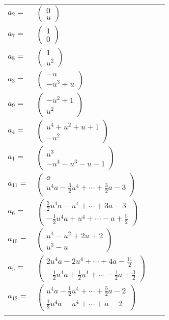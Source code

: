 \documentclass[1p]{elsarticle_modified}
\theoremstyle{definition}
\begin{document}
\begin{tabular}{m{7pt} m{180pt} m{7pt} m{180pt} }
\flushright $a_{2}=$&$\begin{pmatrix}0\\u\end{pmatrix}$ \\
\flushright $a_{7}=$&$\begin{pmatrix}1\\0\end{pmatrix}$ \\
\flushright $a_{8}=$&$\begin{pmatrix}1\\u^2\end{pmatrix}$ \\
\flushright $a_{3}=$&$\begin{pmatrix}- u\\- u^3+u\end{pmatrix}$ \\
\flushright $a_{9}=$&$\begin{pmatrix}- u^2+1\\u^2\end{pmatrix}$ \\
\flushright $a_{4}=$&$\begin{pmatrix}u^4+u^2+u+1\\- u^2\end{pmatrix}$ \\
\flushright $a_{1}=$&$\begin{pmatrix}u^3\\- u^4- u^3- u-1\end{pmatrix}$ \\
\flushright $a_{11}=$&$\begin{pmatrix}a\\u^4 a-\frac{3}{2} u^4+\cdots+\frac{3}{2} a-3\end{pmatrix}$ \\
\flushright $a_{6}=$&$\begin{pmatrix}\frac{3}{2} u^4 a- u^4+\cdots+3 a-3\\-\frac{1}{2} u^4 a+u^4+\cdots- a+\frac{5}{2}\end{pmatrix}$ \\
\flushright $a_{10}=$&$\begin{pmatrix}u^4- u^2+2 u+2\\u^3- u\end{pmatrix}$ \\
\flushright $a_{5}=$&$\begin{pmatrix}2 u^4 a-2 u^4+\cdots+4 a-\frac{11}{2}\\-\frac{1}{2} u^4 a+\frac{1}{2} u^4+\cdots-\frac{1}{2} a+\frac{3}{2}\end{pmatrix}$ \\
\flushright $a_{12}=$&$\begin{pmatrix}u^4 a-\frac{1}{2} u^4+\cdots+\frac{5}{2} a-2\\\frac{1}{2} u^4 a- u^4+\cdots+a-2\end{pmatrix}$\\&\end{tabular}
\end{document}
